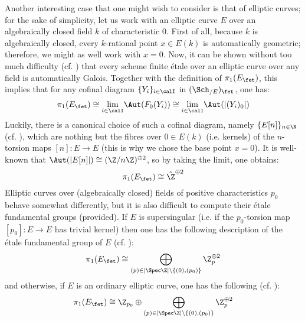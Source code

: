     Another interesting case that one might wish to consider is that of elliptic curves; for the sake of simplicity, let us work with an elliptic curve $E$ over an algebraically closed field $k$ of characteristic $0$. First of all, because $k$ is algebraically closed, every $k$-rational point $x \in E(k)$ is automatically geometric; therefore, we might as well work with $x = 0$. Now, it can be shown without too much difficulty (cf. \cite[Proposition 5.11]{kundu_etale_fundamental_group_of_elliptic_curves}) that every scheme finite \'etale over an elliptic curve over any field is automatically Galois. Together with the definition of $\pi_1(E_{\fet})$, this implies that for any cofinal diagram $\{Y_i\}_{i \in \calI}$ in $(\Sch_{/E})_{\fet}$, one has:
                    $$\pi_1(E_{\fet}) \cong \underset{i \in \calI}{\lim} \Aut(F_0(Y_i)) \cong \underset{i \in \calI}{\lim} \Aut(|(Y_i)_0|)$$
                Luckily, there is a canonical choice of such a cofinal diagram, namely $\{E[n]\}_{n \in \N}$ (cf. \cite[Proposition 3.8]{kundu_etale_fundamental_group_of_elliptic_curves}), which are nothing but the fibres over $0 \in E(k)$ (i.e. kernels) of the $n$-torsion maps $[n]: E \to E$ (this is why we chose the base point $x = 0$). It is well-known that $\Aut(|E[n]|) \cong (\Z/n\Z)^{\oplus 2}$, so by taking the limit, one obtains:
                    $$\pi_1(E_{\fet}) \cong \hat{\Z}^{\oplus 2}$$
                Elliptic curves over (algebraically closed) fields of positive characteristics $p_0$ behave somewhat differently, but it is also difficult to compute their \'etale fundamental groups (provided). If $E$ is supersingular (i.e. if the $p_0$-torsion map $[p_0]: E \to E$ has trivial kernel) then one has the following description of the \'etale fundamental group of $E$ (cf. \cite[Proposition 5.13]{kundu_etale_fundamental_group_of_elliptic_curves}):
                    $$\pi_1(E_{\fet}) \cong \bigoplus_{(p) \in |\Spec \Z| \setminus \{(0), (p_0)\}} \Z_p^{\oplus 2}$$
                and otherwise, if $E$ is an ordinary elliptic curve, one has the following (cf. \cite[Proposition 5.14]{kundu_etale_fundamental_group_of_elliptic_curves}):
                    $$\pi_1(E_{\fet}) \cong \Z_{p_0} \oplus \bigoplus_{(p) \in |\Spec \Z| \setminus \{(0), (p_0)\}} \Z_p^{\oplus 2}$$